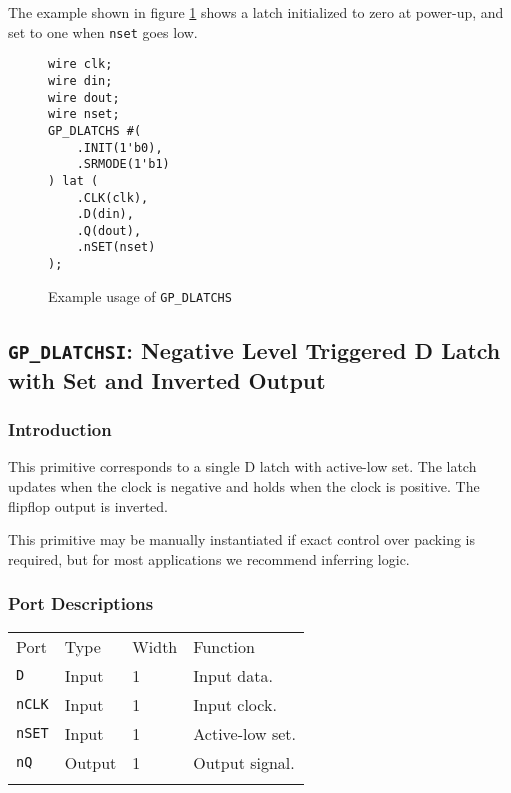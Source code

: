\documentclass[11pt]{article}
\newcommand{\tokenstyle}[1]{\texttt{#1}}
\newcommand{\wirestyle}[1]{\texttt{#1}}
\newcommand{\whenstyle}[1]{{\fontseries{sb}\selectfont#1}}
\newcommand{\thinhline}{\Xhline{1\arrayrulewidth}}
\newcommand{\thickhline}{\Xhline{2.5\arrayrulewidth}}
\begin{document}
The example shown in figure \ref{gp-dlatchs-example} shows a latch initialized to zero at power-up, and set to one
when \wirestyle{nset} goes low.

\begin{figure}[h]
\begin{lstlisting}
wire clk;
wire din;
wire dout;
wire nset;
GP_DLATCHS #(
	.INIT(1'b0),
	.SRMODE(1'b1)
) lat (
	.CLK(clk),
	.D(din),
	.Q(dout),
	.nSET(nset)
);
\end{lstlisting}
\caption{Example usage of \tokenstyle{GP\_DLATCHS}}
\label{gp-dlatchs-example}
\end{figure}


\pagebreak
\subsection{\tokenstyle{GP\_DLATCHSI}: Negative Level Triggered D Latch with Set and Inverted Output}
\label{gp-latchsi}

\subsubsection{Introduction}
This primitive corresponds to a single D latch with active-low set. The latch updates when the clock is negative and holds 
when the clock is positive. The flipflop output is inverted.

This primitive may be manually instantiated if exact control over packing is required, but for most applications we
recommend inferring logic.

\subsubsection{Port Descriptions}

\begin{tabularx}{\textwidth}{lllX}
\thinhline
\whenstyle{Port} & \whenstyle{Type} & \whenstyle{Width} & \whenstyle{Function} \\
\thickhline
\tokenstyle{D} & Input & 1 & Input data. \\
\thinhline
\tokenstyle{nCLK} & Input & 1 & Input clock. \\
\thinhline
\tokenstyle{nSET} & Input & 1 & Active-low set. \\
\thinhline
\tokenstyle{nQ} & Output & 1 & Output signal. \\
\thinhline
\end{tabularx}
\end{document}
